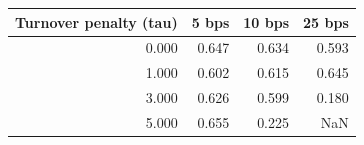 \begin{tabular}{rrrr}
\toprule
Turnover penalty (tau) & 5 bps & 10 bps & 25 bps \\
\midrule
0.000 & 0.647 & 0.634 & 0.593 \\
1.000 & 0.602 & 0.615 & 0.645 \\
3.000 & 0.626 & 0.599 & 0.180 \\
5.000 & 0.655 & 0.225 & NaN \\
\bottomrule
\end{tabular}
